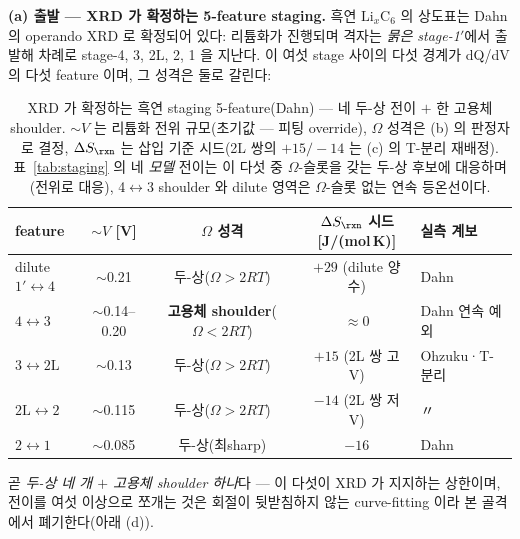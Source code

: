 \textbf{(a) 출발 --- XRD 가 확정하는 5-feature staging.} 흑연 $\mathrm{Li}_x\mathrm C_6$ 의 상도표는 Dahn 의
operando XRD 로 확정되어 있다\cite{dahn1991}: 리튬화가 진행되며 격자는 \emph{묽은 stage-1$'$}에서 출발해
차례로 stage-4, 3, 2L, 2, 1 을 지난다. 이 여섯 stage 사이의 다섯 경계가 dQ/dV 의 다섯 feature 이며, 그
성격은 둘로 갈린다:
\begin{table}[t]
\centering\footnotesize
\renewcommand{\arraystretch}{1.3}
\caption{XRD 가 확정하는 흑연 staging 5-feature(Dahn\cite{dahn1991}) --- 네 두-상 전이 $+$ 한 고용체
shoulder. $\sim V$ 는 리튬화 전위 규모(초기값 --- 피팅 override), $\Omega$ 성격은 (b) 의 판정자로 결정,
$\Delta S_\rxn$ 는 삽입 기준 시드(2L 쌍의 $+15/-14$ 는 (c) 의 T-분리 재배정). 표~\ref{tab:staging} 의 네
\emph{모델} 전이는 이 다섯 중 $\Omega$-슬롯을 갖는 두-상 후보에 대응하며(전위로 대응), 4$\leftrightarrow$3
shoulder 와 dilute 영역은 $\Omega$-슬롯 없는 연속 등온선이다.}
\label{tab:gr2L-features}
\begin{tabular}{@{}l c c c l@{}}
\toprule
feature & $\sim V$ [V] & $\Omega$ 성격 & $\Delta S_\rxn$ 시드 [J/(mol\,K)] & 실측 계보 \\
\midrule
dilute\,$1'\!\leftrightarrow\!4$ & $\sim$0.21    & 두-상($\Omega{>}2RT$)          & $+29$ (dilute 양수) & Dahn\cite{dahn1991} \\
$4\!\leftrightarrow\!3$          & $\sim$0.14--0.20 & \textbf{고용체 shoulder}($\Omega{<}2RT$) & $\approx0$          & Dahn 연속 예외\cite{dahn1991,rsc2021} \\
$3\!\leftrightarrow\!2\mathrm L$ & $\sim$0.13    & 두-상($\Omega{>}2RT$)          & $+15$ (2L 쌍 고V)   & Ohzuku\cite{ohzuku1993}·T-분리 \\
$2\mathrm L\!\leftrightarrow\!2$ & $\sim$0.115   & 두-상($\Omega{>}2RT$)          & $-14$ (2L 쌍 저V)   & 〃 \\
$2\!\leftrightarrow\!1$          & $\sim$0.085   & 두-상(최sharp)                 & $-16$              & Dahn\cite{dahn1991} \\
\bottomrule
\end{tabular}
\end{table}
곧 \emph{두-상 네 개 $+$ 고용체 shoulder 하나}다 --- 이 다섯이 XRD 가 지지하는 상한이며, 전이를 여섯 이상으로
쪼개는 것은 회절이 뒷받침하지 않는 curve-fitting 이라 본 골격에서 폐기한다(아래 (d)).

